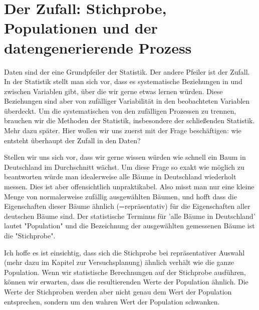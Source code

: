 \documentclass[a4paper,twoside]{tufte-book}\usepackage[]{graphicx}\usepackage[]{color}
\begin{document}
	\section{Der Zufall: Stichprobe, Populationen und der datengenerierende Prozess}
	
	Daten sind der eine Grundpfeiler der Statistik. Der andere Pfeiler ist der Zufall. In der Statistik stellt man sich vor, dass es systematische Beziehungen in und zwischen Variablen gibt, über die wir gerne etwas lernen würden. Diese Beziehungen sind aber von zufälliger Variabilität in den beobachteten Variablen überdeckt. Um die systematischen von den zufälligen Prozessen zu trennen, brauchen wir die Methoden der Statistik, insbesondere der schließenden Statistik. Mehr dazu später. Hier wollen wir uns zuerst mit der Frage beschäftigen: wie entsteht überhaupt der Zufall in den Daten?
	
	Stellen wir uns sich vor, dass wir gerne wissen würden wie schnell ein Baum in Deutschland im Durchschnitt wächst. Um diese Frage so exakt wie möglich zu beantworten würde man idealerweise alle Bäume in Deutschland wiederholt messen. Dies ist aber offensichtlich unpraktikabel. Also misst man nur eine kleine Menge von normalerweise zufällig ausgewählten Bäumen, und hofft dass die Eigenschaften dieser Bäume ähnlich (=repräsentativ) für die Eigenschaften aller deutschen Bäume sind. Der statistische Terminus für 'alle Bäume in Deutschland' lautet "Population" und die Bezeichnung der ausgewählten gemessenen Bäume ist die "Stichprobe".
		
	Ich hoffe es ist einsichtig, dass sich die Stichprobe bei repräsentativer Auswahl (mehr dazu im Kapitel zur Versuchsplanung) ähnlich verhält wie die ganze Population. Wenn wir statistische Berechnungen auf der Stichprobe ausführen, können wir erwarten, dass die resultierenden Werte der Population ähnlich. Die Werte der Stichproben werden aber nicht genau dem Wert der Population entsprechen, sondern um den wahren Wert der Population schwanken.

	
\end{document}
